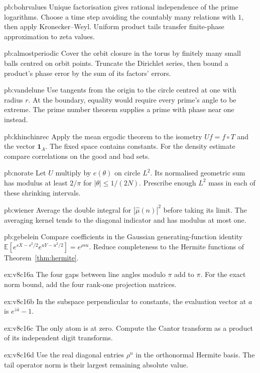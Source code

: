 \begin{hint}{pb:bohrvalues}
Unique factorisation gives rational independence of the prime logarithms. Choose a time step avoiding the countably many relations with $1$, then apply Kronecker--Weyl. Uniform product tails transfer finite-phase approximation to zeta values.
\end{hint}
\begin{hint}{pb:almostperiodic}
Cover the orbit closure in the torus by finitely many small balls centred on orbit points. Truncate the Dirichlet series, then bound a product's phase error by the sum of its factors' errors.
\end{hint}
\begin{hint}{pb:vandelune}
Use tangents from the origin to the circle centred at one with radius $r$. At the boundary, equality would require every prime's angle to be extreme. The prime number theorem supplies a prime with phase near one instead.
\end{hint}
\begin{hint}{pb:khinchinrec}
Apply the mean ergodic theorem to the isometry $Uf=f\circ T$ and the vector $\mathbf1_A$. The fixed space contains constants. For the density estimate compare correlations on the good and bad sets.
\end{hint}
\begin{hint}{pb:norate}
Let $U$ multiply by $e(\theta)$ on circle $L^2$. Its normalised geometric sum has modulus at least $2/\pi$ for $|\theta|\le1/(2N)$. Prescribe enough $L^2$ mass in each of these shrinking intervals.
\end{hint}
\begin{hint}{pb:wiener}
Average the double integral for $|\hat\mu(n)|^2$ before taking its limit. The averaging kernel tends to the diagonal indicator and has modulus at most one.
\end{hint}
\begin{hint}{pb:gebelein}
Compare coefficients in the Gaussian generating-function identity $\mathbb E[e^{sX-s^2/2}e^{uY-u^2/2}]=e^{\rho su}$. Reduce completeness to the Hermite functions of Theorem~\ref{thm:hermite}.
\end{hint}
\begin{hint}{ex:v8c16a}
The four gaps between line angles modulo $\pi$ add to $\pi$. For the exact norm bound, add the four rank-one projection matrices.
\end{hint}
\begin{hint}{ex:v8c16b}
In the subspace perpendicular to constants, the evaluation vector at $a$ is $e^{z\bar a}-1$.
\end{hint}
\begin{hint}{ex:v8c16c}
The only atom is at zero. Compute the Cantor transform as a product of its independent digit transforms.
\end{hint}
\begin{hint}{ex:v8c16d}
Use the real diagonal entries $\rho^n$ in the orthonormal Hermite basis. The tail operator norm is their largest remaining absolute value.
\end{hint}

